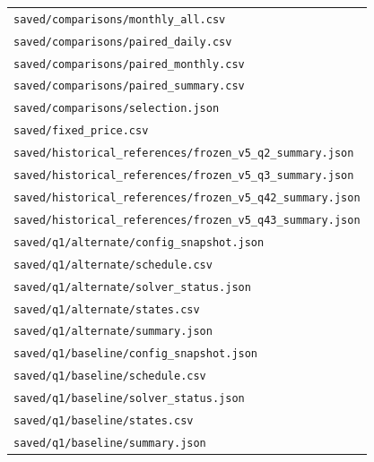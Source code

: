 \begin{longtable}{p{}}
\nolinkurl{saved/comparisons/monthly_all.csv} \\

\nolinkurl{saved/comparisons/paired_daily.csv} \\

\nolinkurl{saved/comparisons/paired_monthly.csv} \\

\nolinkurl{saved/comparisons/paired_summary.csv} \\

\nolinkurl{saved/comparisons/selection.json} \\

\nolinkurl{saved/fixed_price.csv} \\

\nolinkurl{saved/historical_references/frozen_v5_q2_summary.json} \\

\nolinkurl{saved/historical_references/frozen_v5_q3_summary.json} \\

\nolinkurl{saved/historical_references/frozen_v5_q42_summary.json} \\

\nolinkurl{saved/historical_references/frozen_v5_q43_summary.json} \\

\nolinkurl{saved/q1/alternate/config_snapshot.json} \\

\nolinkurl{saved/q1/alternate/schedule.csv} \\

\nolinkurl{saved/q1/alternate/solver_status.json} \\

\nolinkurl{saved/q1/alternate/states.csv} \\

\nolinkurl{saved/q1/alternate/summary.json} \\

\nolinkurl{saved/q1/baseline/config_snapshot.json} \\

\nolinkurl{saved/q1/baseline/schedule.csv} \\

\nolinkurl{saved/q1/baseline/solver_status.json} \\

\nolinkurl{saved/q1/baseline/states.csv} \\

\nolinkurl{saved/q1/baseline/summary.json} \\


\end{longtable}
